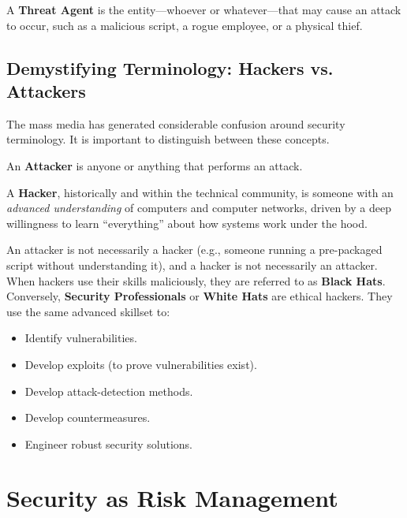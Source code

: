 A \textbf{Threat Agent} is the entity---whoever or whatever---that may cause an attack to occur, such as a malicious script, a rogue employee, or a physical thief.

\subsection{Demystifying Terminology: Hackers vs. Attackers}
The mass media has generated considerable confusion around security terminology. It is important to distinguish between these concepts.

An \textbf{Attacker} is anyone or anything that performs an attack.

A \textbf{Hacker}, historically and within the technical community, is someone with an \textit{advanced understanding} of computers and computer networks, driven by a deep willingness to learn ``everything'' about how systems work under the hood. 

An attacker is not necessarily a hacker (e.g., someone running a pre-packaged script without understanding it), and a hacker is not necessarily an attacker. When hackers use their skills maliciously, they are referred to as \textbf{Black Hats}. Conversely, \textbf{Security Professionals} or \textbf{White Hats} are ethical hackers. They use the same advanced skillset to:
\begin{itemize}
    \item Identify vulnerabilities.
    \item Develop exploits (to prove vulnerabilities exist).
    \item Develop attack-detection methods.
    \item Develop countermeasures.
    \item Engineer robust security solutions.
\end{itemize}

\section{Security as Risk Management}

